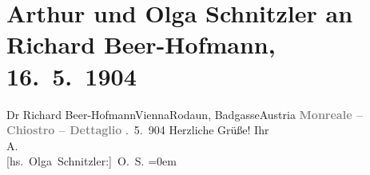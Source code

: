 

         
         \renewcommand{\erwaehntePersonen}{Personen: Richard Beer-Hofmann}
         \renewcommand{\erwaehnteOrte}{Orte: Badgasse, Castellaccio di Monreale, Monreale, Palermo, Rodaun, Wien, Österreich}
         \renewcommand{\erwaehnteWerke}{}
               \section[Arthur und Olga Schnitzler an Richard Beer-Hofmann, 16. 5. 1904]{ Arthur und Olga Schnitzler an Richard Beer-Hofmann, 16. 5. 1904}\nopagebreak{}\rehead{ }\begin{ledgroupsized}[t]{13cm}\normalsize\beginnumbering \toendnotes[C]{\smallbreak\pagebreak[2]} 
\pstart{}{\pb}Dr Richard Beer-Hofmann\pend{}\pstart{}Vienna\pend{}\pstart{}Rodaun, Badgasse\pend{}\pstart{}Austria\pend{}{\bigskip}\pstart
           \noindent{}\centering{}{\pb}\textcolor{gray}{\textbf{Monreale – Chiostro – Dettaglio}}\pend
           . 5. 904\pend
           \pstart
           Herzliche Grüße!\pend
           \pstart
           Ihr{\\[\baselineskip]}\spacefill\mbox{A.}{\\[\baselineskip]}\spacefill\mbox{{[}hs. Olga Schnitzler:{]} O. S.}\pend
           \leftskip=0em{}
         
         \endnumbering{}\end{ledgroupsized}  \newcommand{\dateiname}{L01400}\newcommand{\titel}{Arthur und Olga Schnitzler an Richard Beer-Hofmann, 16. 5. 1904}\newcommand{\editorInnen}{Martin Anton Müller und Gerd-Hermann Susen}
      
